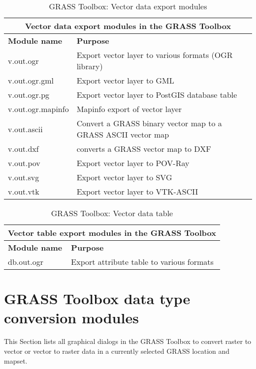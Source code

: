 \begin{table}[H]
\centering
 \begin{tabular}{|p{4cm}|p{10cm}|}
  \hline \multicolumn{2}{|c|}{\textbf{Vector data export modules in the GRASS
Toolbox}} \\
  \hline \textbf{Module name} & \textbf{Purpose} \\
  \hline v.out.ogr & Export vector layer to various formats (OGR library) \\
  \hline v.out.ogr.gml & Export vector layer to GML \\
  \hline v.out.ogr.pg & Export vector layer to PostGIS database table \\
  \hline v.out.ogr.mapinfo & Mapinfo export of vector layer \\
  \hline v.out.ascii & Convert a GRASS binary vector map to a GRASS ASCII
  vector map  \\
  \hline v.out.dxf & converts a GRASS vector map to DXF  \\
  \hline v.out.pov & Export vector layer to POV-Ray \\
  \hline v.out.svg & Export vector layer to SVG \\
  \hline v.out.vtk & Export vector layer to VTK-ASCII \\
\hline
\end{tabular}
\caption{GRASS Toolbox: Vector data export modules}
\end{table}

\begin{table}[H]
\centering
 \begin{tabular}{|p{4cm}|p{10cm}|}
  \hline \multicolumn{2}{|c|}{\textbf{Vector table export modules in the
GRASS Toolbox}} \\
  \hline \textbf{Module name} & \textbf{Purpose} \\
  \hline db.out.ogr & Export attribute table to various formats  \\
\hline
\end{tabular}
\caption{GRASS Toolbox: Vector data table}
\end{table}


\section{GRASS Toolbox data type conversion modules}

This Section lists all graphical dialogs in the GRASS Toolbox to convert
raster to vector or vector to raster data in a currently selected GRASS location 
and mapset.

